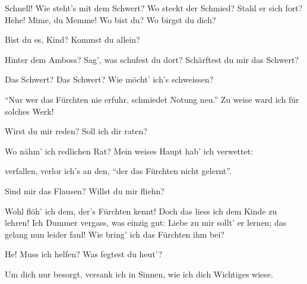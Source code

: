 \begin{drama}
Schnell! Wie steht's mit dem Schwert?
Wo steckt der Schmied?
Stahl er sich fort?
Hehe! Mime, du Memme!
Wo bist du? Wo birgst du dich?

\Mimespeaks


Bist du es, Kind?
Kommst du allein?

\Siegfriedspeaks


Hinter dem Amboss?
Sag', was schufest du dort?
Schärftest du mir das Schwert?

\Mimespeaks


Das Schwert? Das Schwert?
Wie möcht' ich's schweissen?


``Nur wer das Fürchten
nie erfuhr,
schmiedet Notung neu.''
Zu weise ward ich
für solches Werk!

\Siegfriedspeaks


Wirst du mir reden?
Soll ich dir raten?

\Mimespeaks


Wo nähm' ich redlichen Rat?
Mein weises Haupt
hab' ich verwettet:


verfallen, verlor ich's an den,
``der das Fürchten nicht gelernt''.

\Siegfriedspeaks


Sind mir das Flausen?
Willst du mir fliehn?

\Mimespeaks


Wohl flöh' ich dem,
der's Fürchten kennt!
Doch das liess ich dem Kinde zu lehren!
Ich Dummer vergass,
was einzig gut:
Liebe zu mir
sollt' er lernen;
das gelang nun leider faul!
Wie bring' ich das Fürchten ihm bei?

\Siegfriedspeaks


He! Muss ich helfen?
Was fegtest du heut'?

\Mimespeaks

Um dich nur besorgt,
versank ich in Sinnen,
wie ich dich Wichtiges wiese.


\end{drama}
